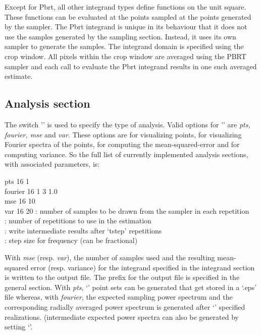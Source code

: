 Except for Pbrt, all other integrand types define functions on the unit square. These functions can be evaluated at the points sampled at the points generated by the sampler. The Pbrt integrand is unique in its behaviour that it does not use the samples generated by the sampling section. Instead, it uses its own sampler to generate the samples. The integrand domain is specified using the crop window. All pixels within the crop window are averaged using the PBRT sampler and each call to evaluate the Pbrt integrand results in one such averaged estimate.


\subsection{Analysis section}
\label{subsec:analyzer}
The switch '' is used to specify the type of analysis. Valid options for '' are \emph{pts, fourier, mse} and \emph{var}. These options are for visualizing points, for visualizing Fourier spectra of the points, for computing the mean-squared-error and for computing variance. So the full list of currently implemented analysis sections, with associated parameters, is:
\begin{tcolorbox}
    pts  16  1 \\
    fourier  16  1  3  1.0 \\
    mse  16  10 \\
    var  16  20 
  \tcblower
    : number of samples to be drawn from the sampler in each repetition \\
    : number of repetitions to use in the estimation \\
    : write intermediate results after `tstep' repetitions \\
    : step size for frequency (can be fractional) 
\end{tcolorbox}
With \emph{mse} (resp. \emph{var}), the number of samples used and the resulting mean-squared error (resp. variance) for the integrand specified in the integrand section is written to the output file. The prefix for the output file is specified in the general section. 
With \emph{pts}, `' point sets can be generated that get stored in a `.eps' file whereas, with \emph{fourier}, the  expected sampling power spectrum and the corresponding radially averaged power spectrum is generated after `' specified realizations. (intermediate expected power spectra can also be generated by setting `'.

